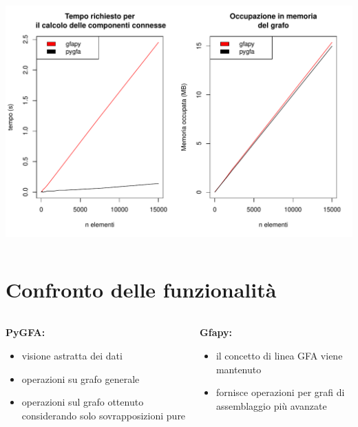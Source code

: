 \documentclass{beamer}
\begin{document}
\begin{frame}{\secname}
\begin{columns}
\begin{column}{0.5\textwidth}
			\centering
			\includegraphics[height=0.45\textheight, width=\textwidth, keepaspectratio]{comparison}
		\end{column}
	\end{columns}
\end{frame}



\section{Confronto delle funzionalità}
\begin{frame}{\secname}
	\begin{columns}[T]
		\begin{column}{0.5\textwidth}
			\textbf{PyGFA:}
			\begin{itemize}
				\item visione astratta dei dati
				\item operazioni su grafo generale
				\item operazioni sul grafo ottenuto considerando
					solo sovrapposizioni pure
			\end{itemize}
		\end{column}
		\begin{column}{0.5\textwidth}
			\textbf{Gfapy:}
			\begin{itemize}
				\item il concetto di linea GFA viene mantenuto
				\item fornisce operazioni per grafi di assemblaggio più avanzate
			\end{itemize}
		\end{column}
	\end{columns}
\end{frame}
\end{document}
